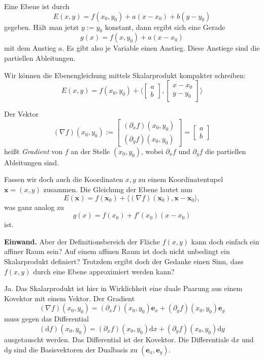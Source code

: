 \documentclass[9pt]{beamer}
\begin{document}
\begin{frame}
Eine Ebene ist durch
\[E(x,y) = f(x_0,y_0)+a(x-x_0)+b(y-y_0)\]
gegeben. Hält man jetzt $y:=y_0$ konstant, dann ergibt sich eine
Gerade
\[g(x) = f(x,y_0)+a(x-x_0)\]
mit dem Anstieg $a$. Es gibt also je Variable einen Anstieg. Diese
Anstiege sind die partiellen Ableitungen.
\end{frame}

\begin{frame}
Wir können die Ebenengleichung mittels Skalarprodukt kompakter schreiben:
\[E(x,y) = f(x_0,y_0) + \langle\begin{bmatrix}a\\ b\end{bmatrix},
\begin{bmatrix}x-x_0\\ y-y_0\end{bmatrix}\rangle\]
\end{frame}

\begin{frame}
Der Vektor
\[(\nabla f)(x_0,y_0) := \begin{bmatrix}(\partial_x f)(x_0,y_0)\\ (\partial_y f)(x_0,y_0)\end{bmatrix}
= \begin{bmatrix}a\\ b\end{bmatrix}\]
heißt \emph{Gradient} von $f$ an der Stelle $(x_0,y_0)$, wobei $\partial_x f$
und $\partial_y f$ die partiellen Ableitungen sind.
\end{frame}

\begin{frame}
Fassen wir doch auch die Koordinaten $x,y$ zu einem Koordinatentupel $\mathbf x = (x,y)$
zusammen. Die Gleichung der Ebene lautet nun
\[E(\mathbf x) = f(\mathbf x_0) + \langle(\nabla f)(\mathbf x_0),\mathbf x-\mathbf x_0\rangle,\]
was ganz analog zu
\[g(x) = f(x_0) + f'(x_0)(x-x_0)\]
ist.
\end{frame}

\begin{frame}
\textbf{Einwand.}
Aber der Definitionsbereich der Fläche $f(x,y)$ kann doch einfach ein
affiner Raum sein? Auf einem affinen Raum ist doch nicht unbedingt ein
Skalarprodukt definiert? Trotzdem ergibt doch der Gedanke einen Sinn,
dass $f(x,y)$ durch eine Ebene approximiert werden kann?
\end{frame}

\begin{frame}
Ja. Das Skalarprodukt ist hier in Wirklichkeit eine duale Paarung aus
einem Kovektor mit einem Vektor. Der Gradient
\[(\nabla f)(x_0,y_0) = (\partial_x f)(x_0,y_0)\mathbf e_x + (\partial_y f)(x_0,y_0)\mathbf e_y\]
muss gegen das Differential
\[(\mathrm df)(x_0,y_0) = (\partial_x f)(x_0,y_0)\mathrm dx + (\partial_y f)(x_0,y_0)\mathrm dy\]
ausgetauscht werden. Das Differential ist der Kovektor.
Die Differentiale $\mathrm dx$ und $\mathrm dy$
sind die Basisvektoren der Dualbasis zu $(\mathbf e_x,\mathbf e_y)$.
\end{frame}
\end{document}
